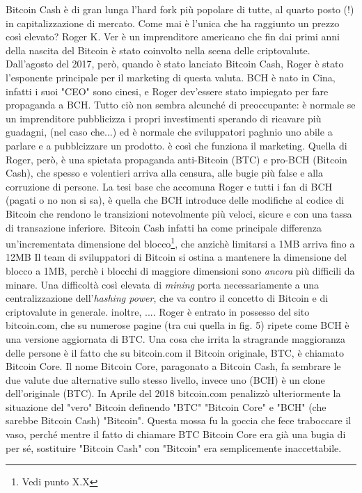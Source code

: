 \documentclass {article}
\begin{document}
Bitcoin Cash è di gran lunga l'hard fork più popolare di tutte, al quarto posto (!) in capitalizzazione di mercato. Come mai è l'unica che ha raggiunto un prezzo così elevato?
Roger K. Ver è un imprenditore americano che fin dai primi anni della nascita del Bitcoin è stato coinvolto nella scena delle criptovalute.
Dall'agosto del 2017, però, quando è stato lanciato Bitcoin Cash, Roger è stato l'esponente principale per il marketing di questa valuta. BCH è nato in Cina, infatti i suoi "CEO" sono cinesi, e Roger dev'essere stato impiegato per fare propaganda a BCH.
Tutto ciò non sembra alcunché di preoccupante: è normale se un imprenditore pubblicizza i propri investimenti sperando di ricavare più guadagni, (nel caso che...) ed è normale che sviluppatori paghnio uno abile a parlare e a pubblcizzare un prodotto.
è così che funziona il marketing.
Quella di Roger, però, è una spietata propaganda anti-Bitcoin (BTC) e pro-BCH (Bitcoin Cash), che spesso e volentieri arriva alla censura, alle bugie più false e alla corruzione di persone.
La tesi base che accomuna Roger e tutti i fan di BCH (pagati o no non si sa), è quella che BCH introduce delle modifiche al codice di Bitcoin che rendono le transizioni notevolmente più veloci, sicure e con una tassa di transazione inferiore. Bitcoin Cash infatti ha come principale differenza un'incrementata dimensione del blocco\footnote{Vedi punto X.X}, che anzichè limitarsi a 1MB arriva fino a 12MB%
Il team di sviluppatori di Bitcoin si ostina a mantenere la dimensione del blocco a 1MB, perchè i blocchi di maggiore dimensioni sono \emph{ancora} più difficili da minare.
Una difficoltà così elevata di \textit{mining} porta necessariamente a una centralizzazione dell'\textit{hashing power}, che va contro il concetto di Bitcoin e di criptovalute in generale. inoltre, .... \cite{bigblocks}
Roger è entrato in possesso del sito bitcoin.com, che su numerose pagine (tra cui quella in fig. 5) ripete come BCH è una versione aggiornata di BTC. Una cosa che irrita la stragrande maggioranza delle persone è il fatto che su bitcoin.com il Bitcoin originale, BTC, è chiamato Bitcoin Core.
Il nome Bitcoin Core, paragonato a Bitcoin Cash, fa sembrare le due valute due alternative sullo stesso livello, invece uno (BCH) è un clone dell'originale (BTC).
In Aprile del 2018 bitcoin.com penalizzò ulteriormente la situazione del "vero" Bitcoin definendo "BTC" "Bitcoin Core" e "BCH" (che sarebbe Bitcoin Cash) "Bitcoin".
Questa mossa fu la goccia che fece traboccare il vaso, perché mentre il fatto di chiamare BTC Bitcoin Core era già una bugia di per sé, sostituire "Bitcoin Cash" con "Bitcoin" era semplicemente inaccettabile.
\end{document}

